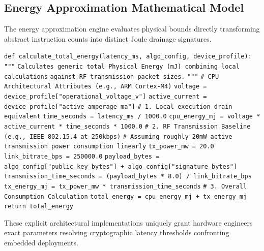 \subsection{Energy Approximation Mathematical Model}

The energy approximation engine evaluates physical bounds directly transforming abstract instruction counts into distinct Joule drainage signatures.

\begin{algorithm*}[htbp]
\caption{Dynamic CPU + RF Transmission Total Energy Approximation}\label{alg:energy_model}
\begin{algorithmic}[1]
\State \texttt{def calculate\_total\_energy(latency\_ms, algo\_config, device\_profile):}
\State \indent \texttt{"""}
\State \indent \texttt{Calculates generic total Physical Energy (mJ) combining local calculations}
\State \indent \texttt{against RF transmission packet sizes.}
\State \indent \texttt{"""}
\State
\State \indent \texttt{\# CPU Architectural Attributes (e.g., ARM Cortex-M4)}
\State \indent \texttt{voltage = device\_profile["operational\_voltage\_v"]}
\State \indent \texttt{active\_current = device\_profile["active\_amperage\_ma"]}
\State
\State \indent \texttt{\# 1. Local execution drain equivalent}
\State \indent \texttt{time\_seconds = latency\_ms / 1000.0}
\State \indent \texttt{cpu\_energy\_mj = voltage * active\_current * time\_seconds * 1000.0}
\State
\State \indent \texttt{\# 2. RF Transmission Baseline (e.g., IEEE 802.15.4 at 250kbps)}
\State \indent \texttt{\# Assuming roughly 20mW active transmission power consumption linearly}
\State \indent \texttt{tx\_power\_mw = 20.0}
\State \indent \texttt{link\_bitrate\_bps = 250000.0}
\State
\State \indent \texttt{payload\_bytes = algo\_config["public\_key\_bytes"] + algo\_config["signature\_bytes"]}
\State \indent \texttt{transmission\_time\_seconds = (payload\_bytes * 8.0) / link\_bitrate\_bps}
\State \indent \texttt{tx\_energy\_mj = tx\_power\_mw * transmission\_time\_seconds}
\State
\State \indent \texttt{\# 3. Overall Consumption Calculation}
\State \indent \texttt{total\_energy = cpu\_energy\_mj + tx\_energy\_mj}
\State
\State \indent \texttt{return total\_energy}
\end{algorithmic}
\end{algorithm*}

These explicit architectural implementations uniquely grant hardware engineers exact parameters resolving cryptographic latency thresholds confronting embedded deployments.
